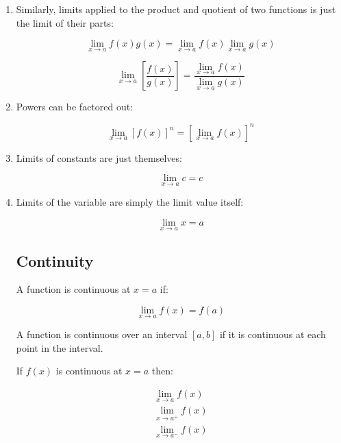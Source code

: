 \documentclass[8pt]{extarticle}
\begin{document}
\begin{multicols}{2}
\begin{enumerate}
	\item Similarly, limits applied to the product and quotient of two functions is just the limit of their parts:

	\begin{equation}
		\lim_{x \to a} f(x)g(x) = \lim_{x \to a} f(x) \lim_{x \to a} g(x)
	\end{equation}
	
	\begin{equation}
		\lim_{x \to a} \left[\frac{f(x)}{g(x)}\right] = \frac{\lim_{x \to a}f(x)}{\lim_{x \to a} g(x)}
	\end{equation}
	
	\item Powers can be factored out:

	\begin{equation}
		\lim_{x \to a} [f(x)]^n = [\lim_{x \to a} f(x)]^n
	\end{equation}
	
	\item Limits of constants are just themselves:
	
	\begin{equation}
		\lim_{x \to a} c = c
	\end{equation}
	
	\item Limits of the variable are simply the limit value itself:

 	\begin{equation}
		\lim_{x \to a} x = a
	\end{equation}
	
\subsection{Continuity}

A function is continuous at $x=a$ if:

\begin{equation}
	\lim_{x \to a} f(x) = f(a)
\end{equation}

A function is continuous over an interval $[a,b]$ if it is continuous at each point in the interval.

If $f(x)$ is continuous at $x=a$ then:

\begin{equation}
\begin{split}
	\lim_{x \to a} f(x) \\
	\lim_{x \to a^+} f(x) \\ 
	\lim_{x \to a^-} f(x)
\end{split}
\end{equation}


\end{enumerate}
\end{multicols}
\end{document}
